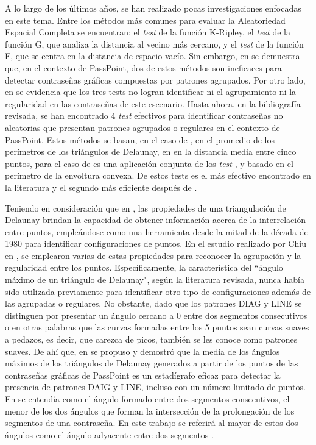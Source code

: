 \documentclass[12pt]{report}
\begin{document}
	A lo largo de los últimos años, se han realizado pocas investigaciones enfocadas en este tema. Entre los métodos más comunes para evaluar la Aleatoriedad Espacial Completa se encuentran: el \textit{test} de la función K-Ripley, el \textit{test} de la función G, que analiza la distancia al vecino más cercano, y el \textit{test} de la función F, que se centra en la distancia de espacio vacío. Sin embargo, en \cite{6,7} se demuestra que, en el contexto de PassPoint, dos de estos métodos son ineficaces para detectar contraseñas gráficas compuestas por patrones agrupados. Por otro lado, en \cite{7,8} se evidencia que los tres tests no logran identificar ni el agrupamiento ni la regularidad en las contraseñas de este escenario. Hasta ahora, en la bibliografía revisada, se han encontrado 4 \textit{test} efectivos \cite{7,9,10,11} para identificar contraseñas no aleatorias que presentan patrones agrupados o regulares en el contexto de PassPoint. Estos métodos se basan, en el caso de \cite{9}, en el promedio de los perímetros de los triángulos de Delaunay, en  \cite{7} en la distancia media entre cinco puntos, para el caso de \cite{10} es una aplicación conjunta de los \textit{test} \cite{7,9}, y \cite{11} basado en  el perímetro de la envoltura convexa. De estos tests \cite{11} es el más efectivo encontrado en la literatura y el segundo más eficiente después de \cite{7}.
	
	Teniendo en consideración que en \cite{12}, las propiedades de una triangulación de Delaunay brindan la capacidad de obtener información acerca de la interrelación entre puntos, empleándose como una herramienta desde la mitad de la década de 1980 para identificar configuraciones de puntos. En el estudio realizado por Chiu en \cite{12}, se emplearon varias de estas propiedades para reconocer la agrupación y la regularidad entre los puntos. Específicamente, la característica del ``ángulo máximo de un triángulo de Delaunay", según la literatura revisada, nunca había sido utilizada previamente para identificar otro tipo de configuraciones además de las agrupadas o regulares. No obstante, dado que los patrones DIAG y LINE se distinguen por presentar un ángulo cercano a 0{\degree } entre dos segmentos consecutivos o en otras palabras que las curvas formadas entre los 5 puntos sean curvas suaves a pedazos, es decir, que carezca de picos, también se les conoce como patrones suaves.  De ahí que, en \cite{13} se propuso y demostró que la media de los ángulos máximos de los triángulos de Delaunay generados a partir de los puntos de las contraseñas gráficas de PassPoint es un estadígrafo eficaz para detectar la presencia de patrones DAIG y LINE, incluso con un número limitado de puntos. En \cite{5} se entendía como el ángulo formado entre dos segmentos consecutivos, el menor de los dos ángulos que forman la intersección de la prolongación de los segmentos de una contraseña. En este trabajo se referirá al mayor de estos dos ángulos como el ángulo adyacente entre dos segmentos .
\end{document}

